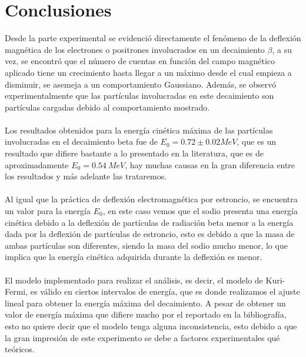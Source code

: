 \documentclass[10pt,twocolumns,letterpaper]{article}
\begin{document}
\section*{Conclusiones}
Desde la parte experimental se evidenció directamente el fenómeno de la deflexión magnética de los electrones o positrones involucrados en un decaimiento $\beta$, a su vez, se encontró que el número de cuentas en función del campo magnético aplicado tiene un crecimiento hasta llegar a un máximo desde el cual empieza a disminuir, se asemeja a un comportamiento Gaussiano. Además, se observó experimentalmente que las partículas involucradas en este decaimiento son partículas cargadas debido al comportamiento mostrado.  \\ \\
Los resultados obtenidos para la energía cinética máxima de las partículas involucradas en el decaimiento beta fue de  $E_0 = 0.72\pm 0.02 MeV$, que es un resultado que difiere bastante a lo presentado en la literatura, que es de aproximadamente $E_0 = 0.54 \:  MeV$, hay muchas causas en la gran diferencia entre los resultados y más adelante las trataremos. \\ \\
Al igual que la práctica de deflexión electromagnética por estroncio, se encuentra un valor para la energía $E_0$, en este caso vemos que el sodio presenta una energía cinética debido a la deflexión de partículas de radiación beta menor a la energía dada por la deflexión de partículas de estroncio, esto es debido a que la masa de ambas partículas son diferentes, siendo la masa del sodio mucho menor, lo que implica que la energía cinética adquirida durante la deflexión es menor. \\ \\
El modelo implementado para realizar el análisis, es decir, el modelo de Kuri-Fermi, es válido en ciertos intervalos de energía, que es donde realizamos el ajuste lineal para obtener la energía máxima del decaimiento. A pesar de obtener un valor de energía máxima que difiere mucho por el reportado en la bibliografía, esto no quiere decir que el modelo tenga alguna inconsistencia, esto debido a que la gran impresión de este experimento se debe a factores experimentales qué teóricos.  \\ \\
\end{document}
